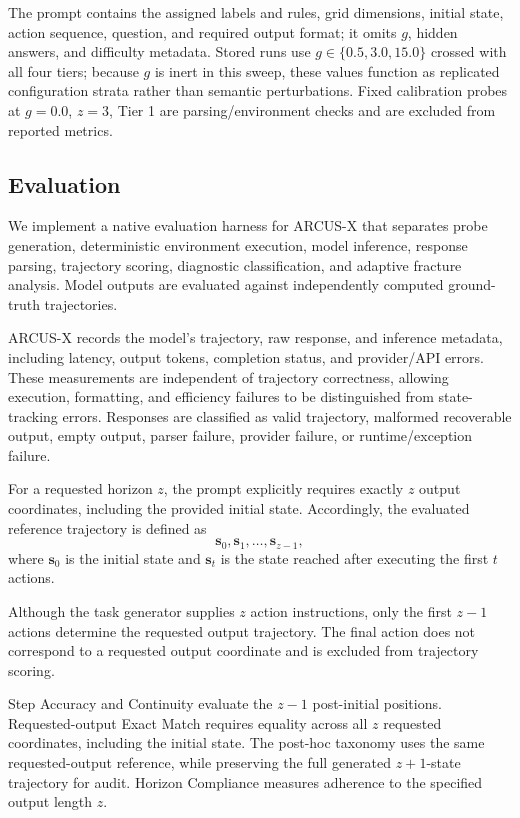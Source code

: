 \documentclass{article}
\begin{document}
The prompt contains the assigned labels and rules, grid dimensions, initial state, action sequence, question, and required output format; it omits $g$, hidden answers, and difficulty metadata. Stored runs use $g\in\{0.5,3.0,15.0\}$ crossed with all four tiers; because $g$ is inert in this sweep, these values function as replicated configuration strata rather than semantic perturbations. Fixed calibration probes at $g=0.0$, $z=3$, Tier 1 are parsing/environment checks and are excluded from reported metrics.

\subsection{Evaluation}

We implement a native evaluation harness for ARCUS-X that separates probe generation, deterministic environment execution, model inference, response parsing, trajectory scoring, diagnostic classification, and adaptive fracture analysis. Model outputs are evaluated against independently computed ground-truth trajectories.

ARCUS-X records the model's trajectory, raw response, and inference metadata, including latency, output tokens, completion status, and provider/API errors. These measurements are independent of trajectory correctness, allowing execution, formatting, and efficiency failures to be distinguished from state-tracking errors. Responses are classified as valid trajectory, malformed recoverable output, empty output, parser failure, provider failure, or runtime/exception failure.

For a requested horizon $z$, the prompt explicitly requires
exactly $z$ output coordinates, including the provided initial
state. Accordingly, the evaluated reference trajectory is
defined as
\[
\mathbf{s}_0,\mathbf{s}_1,\ldots,\mathbf{s}_{z-1},
\]
where $\mathbf{s}_0$ is the initial state and $\mathbf{s}_t$
is the state reached after executing the first $t$ actions.

Although the task generator supplies $z$ action instructions,
only the first $z-1$ actions determine the requested output
trajectory. The final action does not correspond to a
requested output coordinate and is excluded from trajectory
scoring.

Step Accuracy and Continuity evaluate the $z-1$ post-initial
positions. Requested-output Exact Match requires equality across all $z$
requested coordinates, including the initial state. The post-hoc
taxonomy uses the same requested-output reference, while preserving the full
generated $z+1$-state trajectory for audit. Horizon Compliance
measures adherence to the specified output length $z$.
\end{document}
